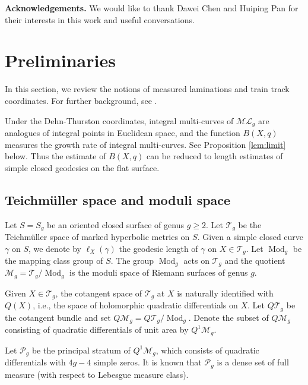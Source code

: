 \documentclass{amsart}
\theoremstyle{plain}
\theoremstyle{definition}
\numberwithin{equation}{section}
\newcommand{\Pg}{\mathcal{P}_g}
\begin{document}
\bigskip
\noindent
{\bf Acknowledgements.} We would like to thank Dawei Chen and Huiping Pan for their interests in this work and useful conversations.








\section{Preliminaries}\label{sec:pre}

In this section, we review the notions of measured laminations and train track coordinates. For further background, see \cite{PH,ES}. 

Under the Dehn-Thurston coordinates,
 integral multi-curves of $\mathcal{ML}_g$
are analogues of integral points in Euclidean space, and the function $B(X,q)$ measures the growth rate of 
integral multi-curves. See Proposition \ref{lem:limit} below. 
Thus the estimate of $B(X,q)$ can be reduced to length estimates of simple closed geodesics 
on the flat surface. 

\subsection{Teichm\"uller space and moduli space}
Let $S=S_g$ be an oriented closed surface of genus $g\geq 2$.
Let $\mathcal{T}_g$ be the Teichm\"uller space of marked hyperbolic metrics on $S$. Given a simple closed curve $\gamma$ on $S$, we denote by $\ell_X(\gamma)$ 
the geodesic length of $\gamma$ on $X\in \mathcal{T}_g$. 
Let $\operatorname{Mod}_g$ be the mapping class group of $S$. The group $\operatorname{Mod}_g$ acts on $\mathcal{T}_g$ and the quotient 
$\mathcal{M}_g = \mathcal{T}_g / \operatorname{Mod}_g$ is the moduli space of Riemann surfaces of genus $g$. 

Given $X\in \mathcal{T}_g$, the cotangent space of $\mathcal{T}_g$ at $X$ is naturally identified with $Q(X)$, i.e., the space of holomorphic quadratic differentials on $X$. Let $Q\mathcal{T}_g$ be the cotangent bundle and set
$Q\mathcal{M}_g =  Q\mathcal{T}_g / \operatorname{Mod}_g$.
Denote the subset of $Q\mathcal{M}_g$ consisting of quadratic differentials of unit area by  $Q^1\mathcal{M}_g$. 


Let $\Pg$ be the principal stratum of $Q^1\mathcal{M}_{g}$, 
which consists of quadratic differentials with $4g-4$ simple zeros. It is known that $\Pg$ is a dense set of full measure (with
 respect to Lebesgue measure class). 
\end{document}
